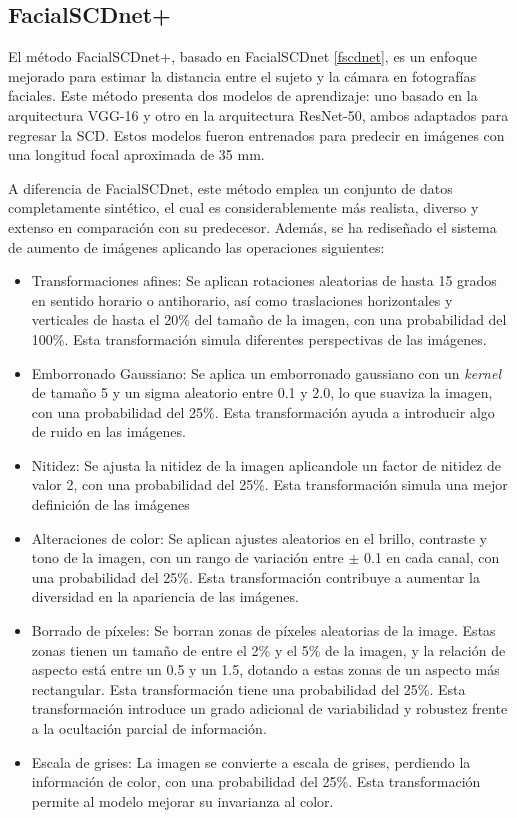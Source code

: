 \subsection{FacialSCDnet+}

El método FacialSCDnet+, basado en FacialSCDnet \ref{fscdnet}, es un enfoque mejorado para estimar la distancia entre el sujeto y la cámara en fotografías faciales. Este método presenta dos modelos de aprendizaje: uno basado en la arquitectura VGG-16 y otro en la arquitectura ResNet-50, ambos adaptados para regresar la SCD. Estos modelos fueron entrenados para predecir en imágenes con una longitud focal aproximada de 35 mm.

A diferencia de FacialSCDnet, este método emplea un conjunto de datos completamente sintético, el cual es considerablemente más realista, diverso y extenso en comparación con su predecesor. Además, se ha rediseñado el sistema de aumento de imágenes aplicando las operaciones siguientes:

\begin{itemize}
	\item Transformaciones afines: Se aplican rotaciones aleatorias de hasta 15 grados en sentido horario o antihorario, así como traslaciones horizontales y verticales de hasta el 20\% del tamaño de la imagen, con una probabilidad del 100\%. Esta transformación simula diferentes perspectivas de las imágenes.
	\item Emborronado Gaussiano: Se aplica un emborronado gaussiano con un \textit{kernel} de tamaño 5 y un sigma aleatorio entre 0.1 y 2.0, lo que suaviza la imagen, con una probabilidad del 25\%. Esta transformación ayuda a introducir algo de ruido en las imágenes.
	\item Nitidez: Se ajusta la nitidez de la imagen aplicandole un factor de nitidez de valor 2, con una probabilidad del 25\%. Esta transformación simula una mejor definición de las imágenes
	\item Alteraciones de color: Se aplican ajustes aleatorios en el brillo, contraste y tono de la imagen, con un rango de variación entre $\pm$ 0.1 en cada canal, con una probabilidad del 25\%. Esta transformación contribuye a aumentar la diversidad en la apariencia de las imágenes.
	\item Borrado de píxeles: Se borran zonas de píxeles aleatorias de la image. Estas zonas tienen un tamaño de entre el 2\% y el 5\% de la imagen, y la relación de aspecto está entre un 0.5 y un 1.5, dotando a estas zonas de un aspecto más rectangular. Esta transformación tiene una probabilidad del 25\%. Esta transformación introduce un grado adicional de variabilidad y robustez frente a la ocultación parcial de información.
	\item Escala de grises: La imagen se convierte a escala de grises, perdiendo la información de color, con una probabilidad del 25\%. Esta transformación permite al modelo mejorar su invarianza al color.
\end{itemize}

